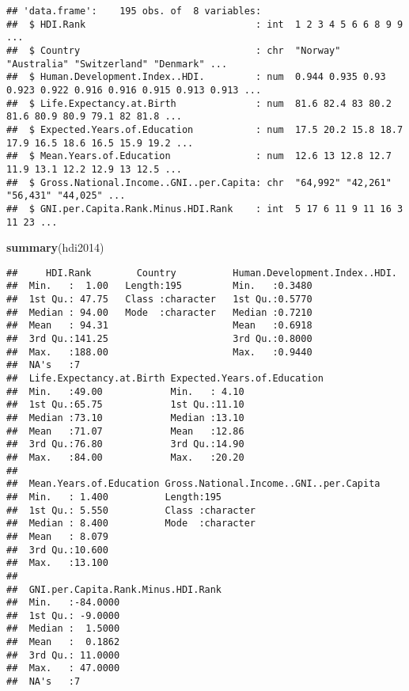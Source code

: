 \documentclass[]{article}
\newenvironment{Shaded}{\begin{snugshade}}{\end{snugshade}}
\newcommand{\KeywordTok}[1]{\textcolor[rgb]{0.13,0.29,0.53}{\textbf{#1}}}
\newcommand{\NormalTok}[1]{#1}
\begin{document}
\begin{verbatim}
## 'data.frame':    195 obs. of  8 variables:
##  $ HDI.Rank                              : int  1 2 3 4 5 6 6 8 9 9 ...
##  $ Country                               : chr  "Norway" "Australia" "Switzerland" "Denmark" ...
##  $ Human.Development.Index..HDI.         : num  0.944 0.935 0.93 0.923 0.922 0.916 0.916 0.915 0.913 0.913 ...
##  $ Life.Expectancy.at.Birth              : num  81.6 82.4 83 80.2 81.6 80.9 80.9 79.1 82 81.8 ...
##  $ Expected.Years.of.Education           : num  17.5 20.2 15.8 18.7 17.9 16.5 18.6 16.5 15.9 19.2 ...
##  $ Mean.Years.of.Education               : num  12.6 13 12.8 12.7 11.9 13.1 12.2 12.9 13 12.5 ...
##  $ Gross.National.Income..GNI..per.Capita: chr  "64,992" "42,261" "56,431" "44,025" ...
##  $ GNI.per.Capita.Rank.Minus.HDI.Rank    : int  5 17 6 11 9 11 16 3 11 23 ...
\end{verbatim}

\begin{Shaded}
\begin{Highlighting}[]
\KeywordTok{summary}\NormalTok{(hdi2014)}
\end{Highlighting}
\end{Shaded}

\begin{verbatim}
##     HDI.Rank        Country          Human.Development.Index..HDI.
##  Min.   :  1.00   Length:195         Min.   :0.3480               
##  1st Qu.: 47.75   Class :character   1st Qu.:0.5770               
##  Median : 94.00   Mode  :character   Median :0.7210               
##  Mean   : 94.31                      Mean   :0.6918               
##  3rd Qu.:141.25                      3rd Qu.:0.8000               
##  Max.   :188.00                      Max.   :0.9440               
##  NA's   :7                                                        
##  Life.Expectancy.at.Birth Expected.Years.of.Education
##  Min.   :49.00            Min.   : 4.10              
##  1st Qu.:65.75            1st Qu.:11.10              
##  Median :73.10            Median :13.10              
##  Mean   :71.07            Mean   :12.86              
##  3rd Qu.:76.80            3rd Qu.:14.90              
##  Max.   :84.00            Max.   :20.20              
##                                                      
##  Mean.Years.of.Education Gross.National.Income..GNI..per.Capita
##  Min.   : 1.400          Length:195                            
##  1st Qu.: 5.550          Class :character                      
##  Median : 8.400          Mode  :character                      
##  Mean   : 8.079                                                
##  3rd Qu.:10.600                                                
##  Max.   :13.100                                                
##                                                                
##  GNI.per.Capita.Rank.Minus.HDI.Rank
##  Min.   :-84.0000                  
##  1st Qu.: -9.0000                  
##  Median :  1.5000                  
##  Mean   :  0.1862                  
##  3rd Qu.: 11.0000                  
##  Max.   : 47.0000                  
##  NA's   :7
\end{verbatim}
\end{document}

